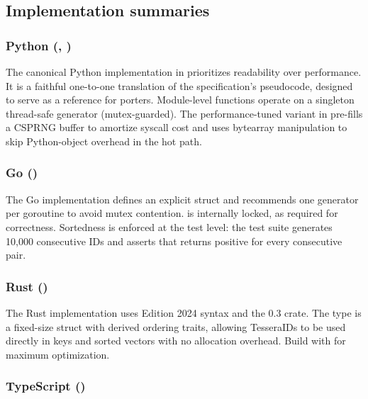 \subsection{Implementation summaries}

\subsubsection{Python (, )}

The canonical Python implementation in  prioritizes readability over performance. It is a faithful one-to-one translation of the specification's pseudocode, designed to serve as a reference for porters. Module-level functions operate on a singleton thread-safe generator (mutex-guarded). The performance-tuned variant in  pre-fills a CSPRNG buffer to amortize syscall cost and uses bytearray manipulation to skip Python-object overhead in the hot path.

\subsubsection{Go ()}

The Go implementation defines an explicit  struct and recommends one generator per goroutine to avoid mutex contention.  is internally locked, as required for correctness. Sortedness is enforced at the test level: the test suite generates 10{,}000 consecutive IDs and asserts that  returns positive for every consecutive pair.

\subsubsection{Rust ()}

The Rust implementation uses Edition 2024 syntax and the  0.3 crate. The  type is a fixed-size struct with derived ordering traits, allowing TesseraIDs to be used directly in  keys and sorted vectors with no allocation overhead. Build with  for maximum optimization.

\subsubsection{TypeScript ()}

